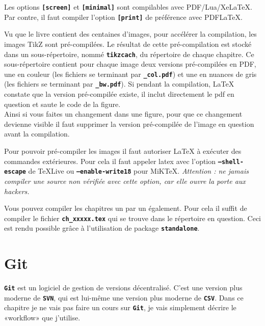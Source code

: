 \documentclass[11pt]{article} %
\newcommand{\cmd}[1]{\textbf{\texttt{\color{red!70!black}#1}}}
\begin{document}
Les options \cmd{[screen]} et \cmd{[minimal]} sont compilables avec PDF/Lua/XeLaTeX. Par contre, il faut compiler l'option \cmd{[print]} de préférence avec PDFLaTeX.

Vu que le livre contient des centaines d'images, pour accélérer la compilation, les images TikZ sont pré-compilées. Le résultat de cette pré-compilation est stocké dans un sous-répertoire,  nommé \cmd{tikzcach}, du répertoire de chaque chapitre. Ce sous-répertoire contient pour chaque image deux versions pré-compilées en PDF, une en couleur (les fichiers se terminant par \cmd{\_col.pdf}) et une en nuances de gris (les fichiers se terminant par \cmd{\_bw.pdf}). Si pendant la compilation, LaTeX constate que la version pré-compilée existe, il inclut directement le pdf en question et saute le code de la figure.\\
Ainsi si vous faites un changement dans une figure, pour que ce changement devienne visible il faut supprimer la version pré-compilée de l'image en question avant la compilation.

Pour pouvoir pré-compiler les images il faut autoriser LaTeX à exécuter des commandes extérieures. Pour cela il faut appeler latex avec l'option \cmd{--shell-escape} de TeXLive ou \cmd{--enable-write18} pour MiKTeX. \textit{Attention : ne jamais compiler une source non vérifiée avec cette option, car elle ouvre la porte aux hackers.}

Vous pouvez compiler les chapitres un par un également. Pour cela il suffit de compiler le fichier \cmd{ch\_xxxxx.tex} qui se trouve dans le répertoire en question. Ceci est rendu possible grâce à l'utilisation de package \cmd{standalone}.

\section{Git}

\cmd{Git} est un logiciel de gestion de versions décentralisé. C'est une version plus moderne de \cmd{SVN}, qui est lui-même une version plus moderne de \cmd{CSV}. Dans ce chapitre je ne vais pas faire un cours sur \cmd{Git}, je vais simplement décrire le «workflow» que j'utilise.
\end{document}
